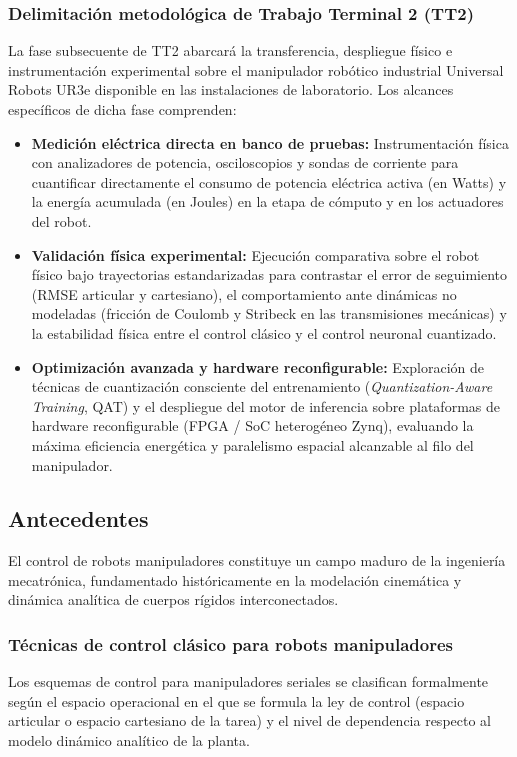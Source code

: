 \documentclass[12pt]{article}
\begin{document}
\subsubsection*{Delimitación metodológica de Trabajo Terminal 2 (TT2)}
La fase subsecuente de TT2 abarcará la transferencia, despliegue físico e instrumentación experimental sobre el manipulador robótico industrial Universal Robots UR3e disponible en las instalaciones de laboratorio. Los alcances específicos de dicha fase comprenden:
\begin{itemize}
    \item \textbf{Medición eléctrica directa en banco de pruebas:} Instrumentación física con analizadores de potencia, osciloscopios y sondas de corriente para cuantificar directamente el consumo de potencia eléctrica activa (en Watts) y la energía acumulada (en Joules) en la etapa de cómputo y en los actuadores del robot.
    \item \textbf{Validación física experimental:} Ejecución comparativa sobre el robot físico bajo trayectorias estandarizadas para contrastar el error de seguimiento (RMSE articular y cartesiano), el comportamiento ante dinámicas no modeladas (fricción de Coulomb y Stribeck en las transmisiones mecánicas) y la estabilidad física entre el control clásico y el control neuronal cuantizado.
    \item \textbf{Optimización avanzada y hardware reconfigurable:} Exploración de técnicas de cuantización consciente del entrenamiento (\textit{Quantization-Aware Training}, QAT) y el despliegue del motor de inferencia sobre plataformas de hardware reconfigurable (FPGA / SoC heterogéneo Zynq), evaluando la máxima eficiencia energética y paralelismo espacial alcanzable al filo del manipulador.
\end{itemize}

\subsection*{Antecedentes}
El control de robots manipuladores constituye un campo maduro de la ingeniería mecatrónica, fundamentado históricamente en la modelación cinemática y dinámica analítica de cuerpos rígidos interconectados.

\subsubsection*{Técnicas de control clásico para robots manipuladores}
Los esquemas de control para manipuladores seriales se clasifican formalmente según el espacio operacional en el que se formula la ley de control (espacio articular o espacio cartesiano de la tarea) y el nivel de dependencia respecto al modelo dinámico analítico de la planta.
\end{document}
